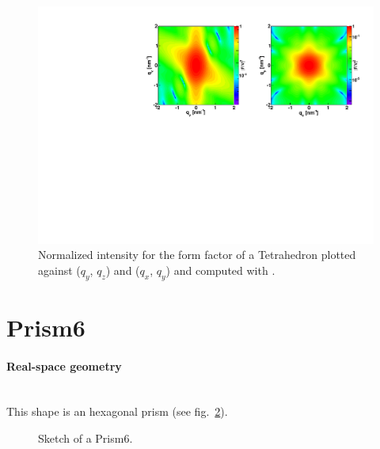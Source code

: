 \begin{figure}[h]
\begin{center}
\includegraphics[width=\textwidth]{Figures/figfftetrahedron}
\end{center}
\caption{Normalized intensity for the form factor of a Tetrahedron
  plotted against ($q_y$, $q_z$) and  ($q_x$, $q_y$) and
  computed with .}
\label{fig:FFtetrahEx}
\end{figure}

\newpage%
\section{Prism6} 

\paragraph{Real-space geometry}\mbox{}\\
This shape is an hexagonal prism (see fig.~\ref{fig:prism6}).

\begin{figure}[ht]
\hfill
{}
\hfill
{}
\hfill
\caption{Sketch of a Prism6.}
\label{fig:prism6}
\end{figure}


